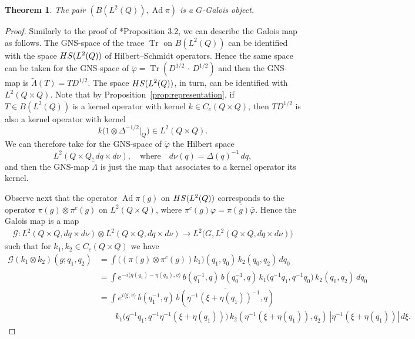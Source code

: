 \documentclass[a4paper,11pt,reqno]{amsart}
\numberwithin{equation}{section}
\newtheorem{theorem}{Theorem}[section]
\theoremstyle{remark}
\theoremstyle{definition}
\newcommand\Ad{\operatorname{Ad}}
\newcommand\Tr{\operatorname{Tr}}
\newcommand\HS{{\rm HS}}
\newcommand{\vf}{\varphi}
\begin{document}
\begin{theorem}\label{thm:key}
The pair $(B(L^2(Q)),\Ad\pi)$ is a $G$-Galois object.
\end{theorem}

\begin{proof}
Similarly to the proof of \cite{GM}*{Proposition 3.2}, we can describe the Galois map as follows. The GNS-space of the trace $\Tr$ on $B(L^2(Q))$ can be identified with the space $\HS(L^2(Q))$ of Hilbert--Schmidt operators. Hence the same space can be taken for the GNS-space of $\tilde\varphi=\Tr(D^{1/2}\,\cdot\, D^{1/2})$ and then the GNS-map is $\tilde\Lambda(T)=TD^{1/2}$. The space $\HS(L^2(Q))$, in turn, can be identified with $L^2(Q\times Q)$. Note that by Proposition~\ref{prop:representation}, if $T\in B(L^2(Q))$  is a kernel operator with kernel $k\in C_c(Q\times Q)$, then $TD^{1/2}$ is also a kernel operator with kernel
$$
k\big(1\otimes \Delta^{-1/2}|_Q\big)\in L^2(Q\times Q).
$$
We can therefore take for the GNS-space of $\tilde\vf$ the Hilbert space
$$
L^2(Q\times Q,dq\times d\nu),\quad\mbox{where}\quad d\nu(q)=\Delta(q)^{-1}\,dq ,
$$
and then the GNS-map $\tilde\Lambda$ is just the map that associates to a kernel operator its kernel.

Observe next that the operator $\Ad\pi(g)$ on $\HS(L^2(Q))$ corresponds to the operator $\pi(g)\otimes\pi^c(g)$ on $L^2(Q\times Q)$, where $\pi^c(g)\vf=\overline{\pi(g)\bar\vf}$. Hence the Galois map is a map
\begin{align*}
{\mathcal G}: L^2(Q\times Q,dq\times d\nu)\otimes L^2(Q\times Q,dq\times d\nu)\to
L^2\big(G,L^2(Q\times Q,dq\times d\nu)\big)
\end{align*}
such that for $k_1,k_2\in C_c(Q\times Q)$ we have
\begin{align*}
{\mathcal G}(k_1\otimes k_2)(g;q_1,q_2)&=\int\big((\pi(g)\otimes\pi^c(g))k_1\big)(q_1,q_0)\,k_2(q_0,q_2)\,
dq_0 \\
&=\int e^{-i \langle\eta(q_1)-\eta(q_0),v\rangle}\,b (q_1^{-1},q)\,\overline{b (q_0^{-1},q)}\, k_1\big(q^{-1}q_1,q^{-1}q_0\big)\,k_2(q_0,q_2)\,
dq_0\\
&=\int e^{i \langle\xi,v\rangle}\,b (q_1^{-1},q)\,\overline{b (\eta^{-1}(\xi+\eta(q_1))^{-1},q)}\, \\
&\qquad k_1\big(q^{-1}q_1,q^{-1}\eta^{-1}(\xi+\eta(q_1))\big)
\,k_2(\eta^{-1}(\xi+\eta(q_1)),q_2)\,
|\eta^{-1}(\xi+\eta(q_1))|\,d\xi.
\end{align*}


\end{proof}
\end{document}
